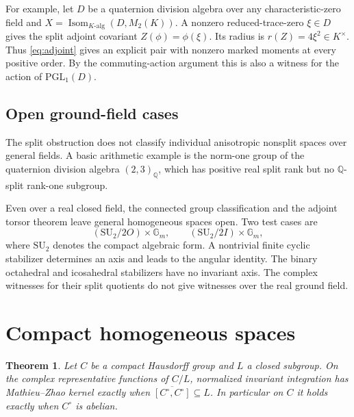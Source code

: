 \documentclass[11pt]{article}
\newtheorem{theorem}{Theorem}[section]
\newcommand{\QQ}{\mathbb Q}
\newcommand{\Gm}{\mathbb G_m}
\newcommand{\SU}{\mathrm{SU}}
\newcommand{\PGL}{\mathrm{PGL}}
\begin{document}
For example, let \(D\) be a quaternion division algebra over any
characteristic-zero field and \(X=\operatorname{Isom}_{K\text{-alg}}
(D,M_2(K))\). A nonzero reduced-trace-zero \(\xi\in D\) gives the
split adjoint covariant \(Z(\phi)=\phi(\xi)\). Its radius is
\(r(Z)=4\xi^2\in K^\times\). Thus \eqref{eq:adjoint} gives an
explicit pair with nonzero marked moments at every positive order.
By the commuting-action argument this is also a witness for the
action of \(\PGL_1(D)\).

\subsection{Open ground-field cases}

The split obstruction does not classify individual anisotropic
nonsplit spaces over general fields. A basic arithmetic example
is the norm-one group of the quaternion division algebra
\((2,3)_{\QQ}\), which has positive real split rank but no
\(\QQ\)-split rank-one subgroup.

Even over a real closed field, the connected group classification
and the adjoint torsor theorem leave general homogeneous spaces
open. Two test cases are
\[
                (\SU_2/2O)\times\Gm,\qquad
                (\SU_2/2I)\times\Gm ,
\]
where \(\SU_2\) denotes the compact algebraic form. A nontrivial
finite cyclic stabilizer determines an axis and leads to the
angular identity. The binary octahedral and icosahedral stabilizers
have no invariant axis. The complex witnesses for their split
quotients do not give witnesses over the real ground field.

\section{Compact homogeneous spaces}

\begin{theorem}\label{thm:compact}
Let \(C\) be a compact Hausdorff group and \(L\) a closed subgroup.
On the complex representative functions of \(C/L\), normalized
invariant integration has Mathieu--Zhao kernel exactly when
\(\overline{[C^\circ,C^\circ]}\subseteq L\). In particular on \(C\)
it holds exactly when \(C^\circ\) is abelian.
\end{theorem}
\end{document}
